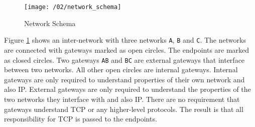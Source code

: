% 
% 
% 
% 
% 







% 

\begin{figure}[H]
\centering
\texttt{[image: /02/network\_schema]}
\caption{Network Schema}
\label{fig:network_schema}
\end{figure}

Figure \ref{fig:network_schema} shows an inter-network with three networks \verb|A|, \verb|B| and
\verb|C|. The networks are connected with gateways marked as open circles. The endpoints are marked
as closed circles. Two gateways \verb|AB| and \verb|BC| are external gateways that interface between
two networks. All other open circles are internal gateways. Internal gateways are only required to
understand properties of their own network and also IP. External gateways are only required to
understand the properties of the two networks they interface with and also IP. There are no
requirement that gateways understand TCP or any higher-level protocols. The result is that all
responsibility for TCP is passed to the endpoints.

